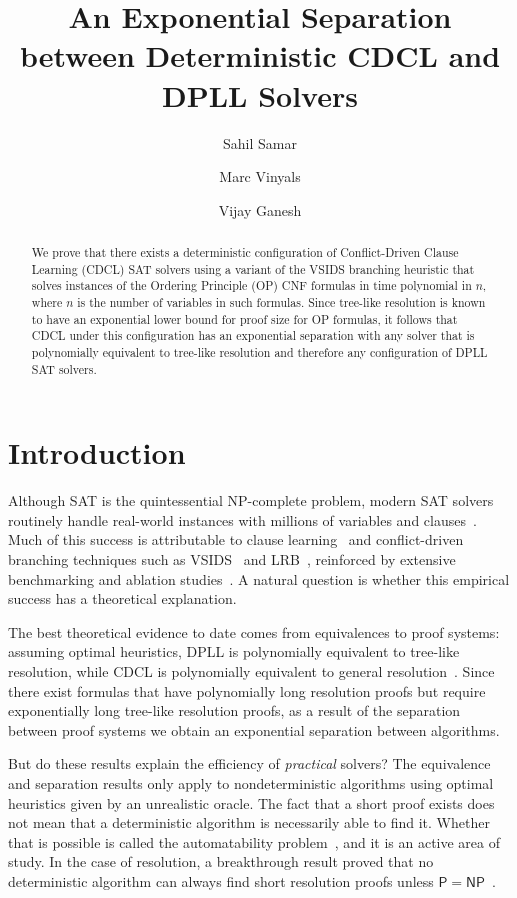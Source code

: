 \documentclass[a4paper,UKenglish,cleveref, autoref, thm-restate]{lipics-v2021}
\title{An Exponential Separation between Deterministic CDCL and DPLL Solvers}
\author{Sahil {Samar}}{School of Computer Science, Georgia Institute of Technology, USA}{ssamar6@gatech.edu}{0009-0000-2395-7823}{}%
\author{Marc Vinyals}{School of Computer Science, University of Auckland, New Zealand}{marc.vinyals@auckland.ac.nz}{0000-0002-1487-445X}{}
\author{Vijay Ganesh}{School of Computer Science, Georgia Institute of Technology, USA}{vganesh@gatech.edu}{0000-0002-6029-2047}{}
\begin{document}
\maketitle 
\begin{abstract}
We prove that there exists a deterministic configuration of Conflict-Driven Clause Learning (CDCL) SAT solvers using a variant of the VSIDS branching heuristic that solves instances of the Ordering Principle (OP) CNF formulas in time polynomial in $n$, where $n$ is the number of variables in such formulas. Since tree-like resolution is known to have an exponential lower bound for proof size for OP formulas, it follows that CDCL under this configuration has an exponential separation with any solver that is polynomially equivalent to tree-like resolution and therefore any configuration of DPLL SAT solvers.
\end{abstract} 

\section{Introduction}
Although SAT is the quintessential NP-complete problem, modern SAT solvers routinely handle real-world instances with millions of variables and clauses~\cite{unreasonable}. Much of this success is attributable to clause learning~\cite{grasp} and conflict-driven branching techniques such as VSIDS~\cite{chaff} and LRB~\cite{maplesat}, reinforced by extensive benchmarking and ablation studies~\cite{katebi2011empirical,elffers2018seeking}. A natural question is whether this empirical success has a theoretical explanation.

The best theoretical evidence to date comes from equivalences to proof systems: assuming optimal heuristics, DPLL is polynomially equivalent to tree-like resolution, while CDCL is polynomially equivalent to general resolution~\cite{simres,manyrestarts}. Since there exist formulas that have polynomially long resolution proofs but require exponentially long tree-like resolution proofs, as a result of the separation between proof systems we obtain an exponential separation between algorithms.

But do these results explain the efficiency of \textit{practical} solvers? The equivalence and separation results only apply to nondeterministic algorithms using optimal heuristics given by an unrealistic oracle. The fact that a short proof exists does not mean that a deterministic algorithm is necessarily able to find it. Whether that is possible is called the automatability problem~\cite{DBLP:journals/siamcomp/BonetPR00}, and it is an active area of study. In the case of resolution, a breakthrough result proved that no deterministic algorithm can always find short resolution proofs unless $\mathsf{P}=\mathsf{NP}$~\cite{DBLP:journals/jacm/AtseriasM20}.
\end{document}
